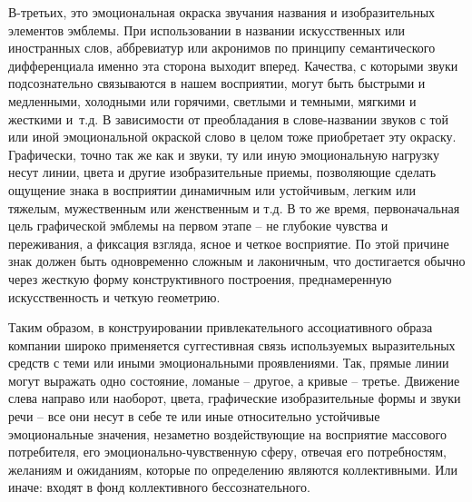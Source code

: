 В-третьих, это эмоциональная окраска звучания названия и изобразительных
элементов эмблемы. При использовании в названии искусственных или иностранных
слов, аббревиатур или акронимов по принципу семантического дифференциала именно
эта сторона выходит вперед. Качества, с которыми звуки подсознательно связываются
в нашем восприятии, могут быть быстрыми и медленными, холодными или горячими,
светлыми и темными, мягкими и жесткими
и~т.д.\autocite{juravlev1991zvuk} В зависимости от преобладания в слове-названии
звуков с той или иной эмоциональной окраской слово в целом тоже приобретает эту
окраску. Графически, точно так же как и звуки, ту или иную эмоциональную
нагрузку несут линии, цвета и другие изобразительные приемы, позволяющие
сделать ощущение знака в восприятии динамичным или устойчивым, легким или
тяжелым, мужественным или женственным и т.д. В то же время, первоначальная цель
графической эмблемы на первом этапе -- не глубокие чувства и переживания, а
фиксация взгляда, ясное и четкое восприятие. По этой причине знак должен быть
одновременно сложным и лаконичным, что достигается обычно через жесткую форму
конструктивного построения, преднамеренную искусственность и четкую геометрию.

Таким образом, в конструировании привлекательного ассоциативного образа компании
широко применяется суггестивная связь используемых выразительных средств с теми
или иными эмоциональными проявлениями. Так, прямые линии  могут выражать одно
состояние, ломаные -- другое, а кривые -- третье. Движение слева направо или
наоборот,  цвета, графические изобразительные формы и звуки речи -- все они
несут в себе те или иные относительно устойчивые эмоциональные значения,
незаметно воздействующие на восприятие массового потребителя, его
эмоционально-чувственную сферу, отвечая его потребностям, желаниям и ожиданиям,
которые по определению являются коллективными. Или иначе: входят в фонд
коллективного бессознательного.


